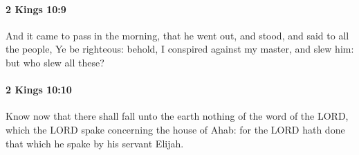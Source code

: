 		\paragraph{2 Kings 10:9} %
			\label{2KINGS-10-9}

			And it came to pass in the morning, that he went out, and stood, and said to all the people, Ye be righteous: behold, I conspired against my master, and slew him: but who slew all these?


		\paragraph{2 Kings 10:10} %
			\label{2KINGS-10-10}

			Know now that there shall fall unto the earth nothing of the word of the LORD, which the LORD spake concerning the house of Ahab: for the LORD hath done that which he spake by his servant Elijah.

